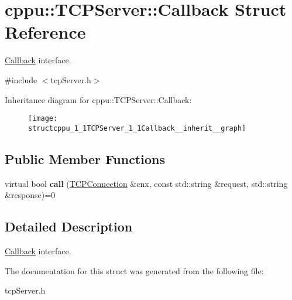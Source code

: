\hypertarget{structcppu_1_1TCPServer_1_1Callback}{}\section{cppu\+:\+:T\+C\+P\+Server\+:\+:Callback Struct Reference}
\label{structcppu_1_1TCPServer_1_1Callback}


\hyperlink{structcppu_1_1TCPServer_1_1Callback}{Callback} interface.  




{\ttfamily \#include $<$tcp\+Server.\+h$>$}



Inheritance diagram for cppu\+:\+:T\+C\+P\+Server\+:\+:Callback\+:
\nopagebreak
\begin{figure}[H]
\begin{center}
\leavevmode
\texttt{[image: structcppu\_1\_1TCPServer\_1\_1Callback\_\_inherit\_\_graph]}
\end{center}
\end{figure}
\subsection*{Public Member Functions}
\begin{DoxyCompactItemize}
\item 
\hypertarget{structcppu_1_1TCPServer_1_1Callback_aabe4b0b30e14ddeb7c0c02aa3a335eba}{}virtual bool {\bfseries call} (\hyperlink{classcppu_1_1TCPConnection}{T\+C\+P\+Connection} \&cnx, const std\+::string \&request, std\+::string \&response)=0\label{structcppu_1_1TCPServer_1_1Callback_aabe4b0b30e14ddeb7c0c02aa3a335eba}

\end{DoxyCompactItemize}


\subsection{Detailed Description}
\hyperlink{structcppu_1_1TCPServer_1_1Callback}{Callback} interface. 

The documentation for this struct was generated from the following file\+:\begin{DoxyCompactItemize}
\item 
tcp\+Server.\+h\end{DoxyCompactItemize}
